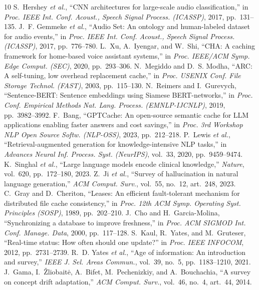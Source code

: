 \documentclass[journal]{IEEEtran}
\begin{document}
\begin{thebibliography}{10}
 S.~Hershey \emph{et al.}, ``CNN architectures for large-scale audio classification,'' in \emph{Proc. IEEE Int. Conf. Acoust., Speech Signal Process. (ICASSP)}, 2017, pp.~131--135.
 J.~F. Gemmeke \emph{et al.}, ``Audio Set: An ontology and human-labeled dataset for audio events,'' in \emph{Proc. IEEE Int. Conf. Acoust., Speech Signal Process. (ICASSP)}, 2017, pp.~776--780.
 L.~Xu, A.~Iyengar, and W.~Shi, ``CHA: A caching framework for home-based voice assistant systems,'' in \emph{Proc. IEEE/ACM Symp. Edge Comput. (SEC)}, 2020, pp.~293--306.
 N.~Megiddo and D.~S. Modha, ``ARC: A self-tuning, low overhead replacement cache,'' in \emph{Proc. USENIX Conf. File Storage Technol. (FAST)}, 2003, pp.~115--130.
 N.~Reimers and I.~Gurevych, ``Sentence-BERT: Sentence embeddings using Siamese BERT-networks,'' in \emph{Proc. Conf. Empirical Methods Nat. Lang. Process. (EMNLP-IJCNLP)}, 2019, pp.~3982--3992.
 F.~Bang, ``GPTCache: An open-source semantic cache for LLM applications enabling faster answers and cost savings,'' in \emph{Proc. 3rd Workshop NLP Open Source Softw. (NLP-OSS)}, 2023, pp.~212--218.
 P.~Lewis \emph{et al.}, ``Retrieval-augmented generation for knowledge-intensive NLP tasks,'' in \emph{Advances Neural Inf. Process. Syst. (NeurIPS)}, vol.~33, 2020, pp.~9459--9474.
 K.~Singhal \emph{et al.}, ``Large language models encode clinical knowledge,'' \emph{Nature}, vol.~620, pp.~172--180, 2023.
 Z.~Ji \emph{et al.}, ``Survey of hallucination in natural language generation,'' \emph{ACM Comput. Surv.}, vol.~55, no.~12, art.~248, 2023.
 C.~Gray and D.~Cheriton, ``Leases: An efficient fault-tolerant mechanism for distributed file cache consistency,'' in \emph{Proc. 12th ACM Symp. Operating Syst. Principles (SOSP)}, 1989, pp.~202--210.
 J.~Cho and H.~Garcia-Molina, ``Synchronizing a database to improve freshness,'' in \emph{Proc. ACM SIGMOD Int. Conf. Manage. Data}, 2000, pp.~117--128.
 S.~Kaul, R.~Yates, and M.~Gruteser, ``Real-time status: How often should one update?'' in \emph{Proc. IEEE INFOCOM}, 2012, pp.~2731--2739.
 R.~D. Yates \emph{et al.}, ``Age of information: An introduction and survey,'' \emph{IEEE J. Sel. Areas Commun.}, vol.~39, no.~5, pp.~1183--1210, 2021.
 J.~Gama, I.~{\v Z}liobait{\.e}, A.~Bifet, M.~Pechenizkiy, and A.~Bouchachia, ``A survey on concept drift adaptation,'' \emph{ACM Comput. Surv.}, vol.~46, no.~4, art.~44, 2014.

\end{thebibliography}
\end{document}
